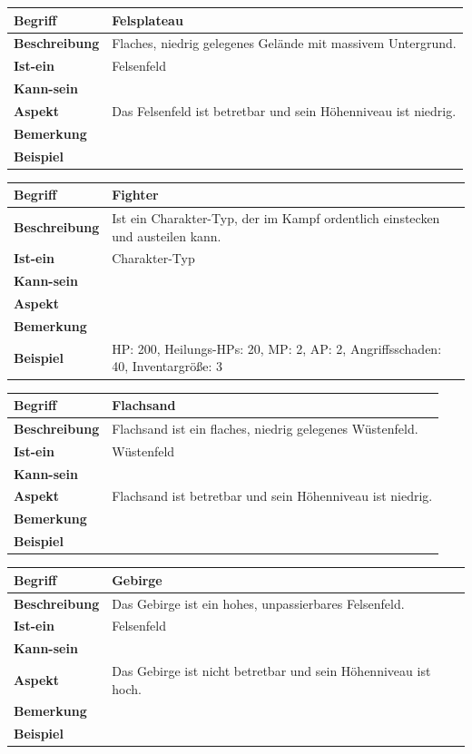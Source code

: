 \documentclass[12pt]{article}
\begin{document}
\begin{tabularx}{\linewidth}{|l|X|}
\hline
\textbf{Begriff} & \textbf{Felsplateau} \\
\hline
\textbf{Beschreibung} & Flaches, niedrig gelegenes Gelände mit massivem Untergrund. \\
\hline
\textbf{Ist-ein} & Felsenfeld\\
\hline
\textbf{Kann-sein} & \\
\hline
\textbf{Aspekt} & Das Felsenfeld ist betretbar und sein Höhenniveau ist niedrig.\\
\hline
\textbf{Bemerkung} &  \\
\hline
\textbf{Beispiel} &  \\
\hline
\end{tabularx}

\begin{tabularx}{\linewidth}{|l|X|}
\hline
\textbf{Begriff} & \textbf{Fighter} \\
\hline
\textbf{Beschreibung} & Ist ein Charakter-Typ, der im Kampf ordentlich einstecken und austeilen kann. \\
\hline
\textbf{Ist-ein} & Charakter-Typ\\
\hline
\textbf{Kann-sein} & \\
\hline
\textbf{Aspekt} & \\
\hline
\textbf{Bemerkung} &  \\
\hline
\textbf{Beispiel} & HP: 200, Heilungs-HPs: 20, MP: 2, AP: 2, Angriffsschaden: 40, Inventargröße: 3 \\
\hline
\end{tabularx}

\begin{tabularx}{\linewidth}{|l|X|}
\hline
\textbf{Begriff} & \textbf{Flachsand} \\
\hline
\textbf{Beschreibung} & Flachsand ist ein flaches, niedrig gelegenes Wüstenfeld. \\
\hline
\textbf{Ist-ein} & Wüstenfeld\\
\hline
\textbf{Kann-sein} & \\
\hline
\textbf{Aspekt} & Flachsand ist betretbar und sein Höhenniveau ist niedrig.\\
\hline
\textbf{Bemerkung} &  \\
\hline
\textbf{Beispiel} &  \\
\hline
\end{tabularx}

\begin{tabularx}{\linewidth}{|l|X|}
\hline
\textbf{Begriff} & \textbf{Gebirge} \\
\hline
\textbf{Beschreibung} & Das Gebirge ist ein hohes, unpassierbares Felsenfeld. \\
\hline
\textbf{Ist-ein} & Felsenfeld\\
\hline
\textbf{Kann-sein} & \\
\hline
\textbf{Aspekt} & Das Gebirge ist nicht betretbar und sein Höhenniveau ist hoch. \\
\hline
\textbf{Bemerkung} &  \\
\hline
\textbf{Beispiel} &  \\
\hline
\end{tabularx}
\end{document}

